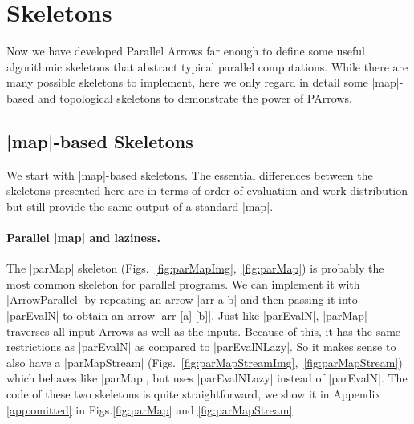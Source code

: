 \section{Skeletons}
\label{sec:skeletons}
Now we have developed Parallel Arrows far enough to define some useful algorithmic skeletons that abstract typical parallel computations. While there are many possible skeletons to implement, here we only regard in detail some |map|-based and topological skeletons to demonstrate the power of PArrows.
\subsection{|map|-based Skeletons}
\label{sec:map-skeletons}
We start with |map|-based skeletons. The essential differences between the skeletons presented here are in terms of order of evaluation and work distribution but still provide the same output of a standard |map|. 

\paragraph{Parallel |map| and laziness.}
The |parMap| skeleton (Figs.~\ref{fig:parMapImg},~\ref{fig:parMap}) is probably the most common skeleton for parallel programs. We can implement it with |ArrowParallel| by repeating an arrow |arr a b| and then passing it into |parEvalN| to obtain an arrow |arr [a] [b]|.
Just like |parEvalN|, |parMap| traverses all input Arrows as well as the inputs.
Because of this, it has the same restrictions as |parEvalN| as compared to |parEvalNLazy|. So it makes sense to also have a |parMapStream| (Figs.~\ref{fig:parMapStreamImg},~\ref{fig:parMapStream}) which behaves like |parMap|, but uses |parEvalNLazy| instead of |parEvalN|. The code of these two skeletons is quite straightforward, we show it in Appendix \ref{app:omitted} in Figs.\ref{fig:parMap} and \ref{fig:parMapStream}.

